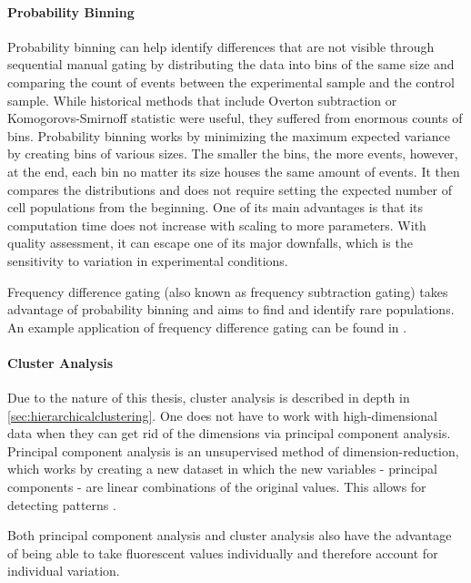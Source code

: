 \paragraph{Probability Binning}
\label{sec:probabilitybinning}
Probability binning can help identify differences that are not visible through sequential manual gating by distributing the data into bins of the same size and comparing the count of events between the experimental sample and the control sample. While historical methods that include Overton subtraction \citep{overton1988modified} or Komogorovs-Smirnoff statistic \citep{young1977proof} were useful, they suffered from enormous counts of bins. Probability binning works by minimizing the maximum expected variance by creating bins of various sizes. The smaller the bins, the more events, however, at the end, each bin no matter its size houses the same amount of events. It then compares the distributions and does not require setting the expected number of cell populations from the beginning. One of its main advantages is that its computation time does not increase with scaling to more parameters. With quality assessment, it can escape one of its major downfalls, which is the sensitivity to variation in experimental conditions.

Frequency difference gating (also known as frequency subtraction gating) takes advantage of probability binning and aims to find and identify rare populations. An example application of frequency difference gating can be found in \cite{roederer2001frequency}.

\paragraph{Cluster Analysis}
\label{sec:clusteran}
Due to the nature of this thesis, cluster analysis is described in depth in \ref{sec:hierarchicalclustering}. 
One does not have to work with high-dimensional data when they can get rid of the dimensions via principal component analysis. Principal component analysis is an unsupervised method of dimension-reduction, which works by creating a new dataset in which the new variables - principal components - are linear combinations of the original values. This allows for detecting patterns \citep{rauber2021cerebrospinal}.

Both principal component analysis and cluster analysis also have the advantage of being able to take fluorescent values individually and therefore account for individual variation.

